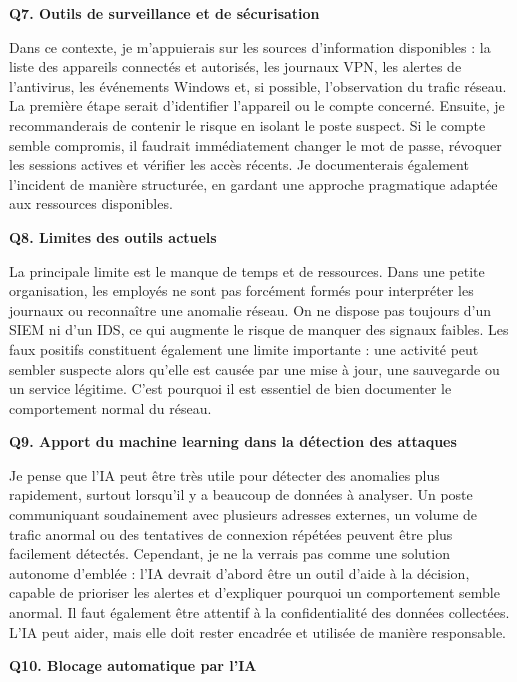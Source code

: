 \documentclass[12pt,a4paper]{article}
\begin{document}
\bigskip
\textbf{Q7. Outils de surveillance et de s\'{e}curisation}

Dans ce contexte, je m'appuierais sur les sources d'information disponibles : la liste des
appareils connect\'{e}s et autoris\'{e}s, les journaux VPN, les alertes de l'antivirus, les
\'{e}v\'{e}nements Windows et, si possible, l'observation du trafic r\'{e}seau. La premi\`{e}re \'{e}tape serait
d'identifier l'appareil ou le compte concern\'{e}. Ensuite, je recommanderais de contenir le risque
en isolant le poste suspect. Si le compte semble compromis, il faudrait imm\'{e}diatement changer
le mot de passe, r\'{e}voquer les sessions actives et v\'{e}rifier les acc\`{e}s r\'{e}cents. Je
documenterais \'{e}galement l'incident de mani\`{e}re structur\'{e}e, en gardant une approche
pragmatique adapt\'{e}e aux ressources disponibles.

\bigskip
\textbf{Q8. Limites des outils actuels}

La principale limite est le manque de temps et de ressources. Dans une petite organisation,
les employ\'{e}s ne sont pas forc\'{e}ment form\'{e}s pour interpr\'{e}ter les journaux ou reconna\^{i}tre une
anomalie r\'{e}seau. On ne dispose pas toujours d'un SIEM ni d'un IDS, ce qui augmente le
risque de manquer des signaux faibles. Les faux positifs constituent \'{e}galement une limite
importante : une activit\'{e} peut sembler suspecte alors qu'elle est caus\'{e}e par une mise \`{a} jour,
une sauvegarde ou un service l\'{e}gitime. C'est pourquoi il est essentiel de bien documenter le
comportement normal du r\'{e}seau.

\bigskip
\textbf{Q9. Apport du machine learning dans la d\'{e}tection des attaques}

Je pense que l'IA peut \^{e}tre tr\`{e}s utile pour d\'{e}tecter des anomalies plus rapidement, surtout
lorsqu'il y a beaucoup de donn\'{e}es \`{a} analyser. Un poste communiquant soudainement avec
plusieurs adresses externes, un volume de trafic anormal ou des tentatives de connexion
r\'{e}p\'{e}t\'{e}es peuvent \^{e}tre plus facilement d\'{e}tect\'{e}s. Cependant, je ne la verrais pas comme une
solution autonome d'embl\'{e}e : l'IA devrait d'abord \^{e}tre un outil d'aide \`{a} la d\'{e}cision, capable
de prioriser les alertes et d'expliquer pourquoi un comportement semble anormal. Il faut
\'{e}galement \^{e}tre attentif \`{a} la confidentialit\'{e} des donn\'{e}es collect\'{e}es. L'IA peut aider, mais elle
doit rester encadr\'{e}e et utilis\'{e}e de mani\`{e}re responsable.

\bigskip
\textbf{Q10. Blocage automatique par l'IA}
\end{document}
